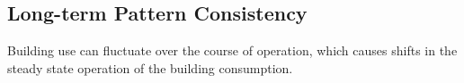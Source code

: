 \subsection{Long-term Pattern Consistency}
\label{sec:patternconsistency}

Building use can fluctuate over the course of operation, which causes shifts in the steady state operation of the building consumption.